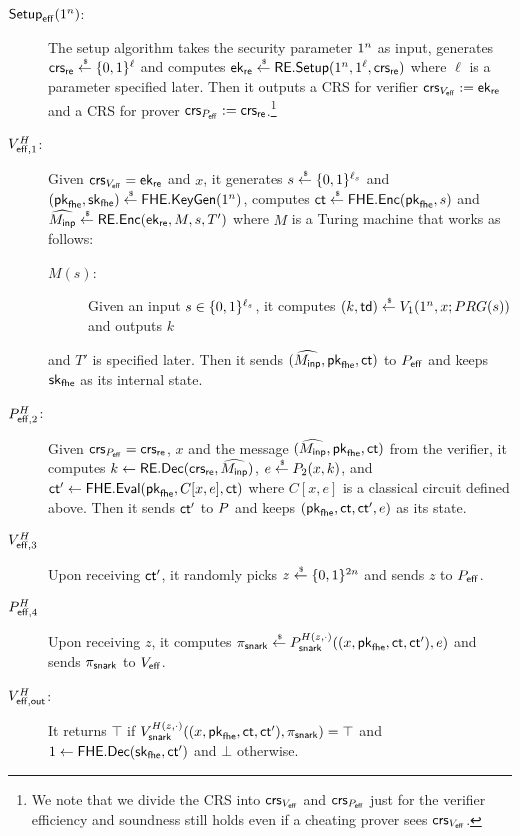 \begin{description}
\item[$\setupeff(1^\secpar)$:]
The setup algorithm takes the security parameter $1^\secpar$ as input, generates $\crs_\re \sample \bit^{\ell}$ %
and computes $\ek_\re\sample \rsetup(1^\secpar,1^\ell,\crs_\re)$ %
where $\ell$ is a parameter specified later.
Then it outputs a CRS for verifier $\crs_{\vereff}\defeq \ek_\re$ and a CRS for prover $\crs_{\proeff}\defeq \crs_\re$.\footnote{We note that we divide the CRS into $\crs_{\vereff}$ and $\crs_{\proeff}$ just for the verifier efficiency and soundness still holds even if a cheating prover sees $\crs_{\vereff}$.} 
\item[$\vereffone^{H}$:] 
Given $\crs_{\vereff}= \ek_\re$ and $x$, 
it generates $s\sample \bit^{\ell_s}$ and $(\pk_{\fhe},\sk_{\fhe})\sample \fhekeygen(1^\secpar)$,
computes $\ct\sample \fheenc(\pk_{\fhe},s)$
and  $\Menc\sample \renc(\ek_\re,M,s,T')$
where $M$ is a Turing machine that works as follows:
\begin{description}
\item[$M(s)$:] Given an input $s\in \bit^{\ell_s}$, it computes $(k,\td)\sample \ver_1(1^\secpar,x;PRG(s))$ and outputs $k$
\end{description}
and $T'$ is specified later.
Then it sends $(\Menc,\pk_{\fhe},\ct)$ to $\proeff$ and keeps $\sk_{\fhe}$ as its internal state.

\item[$\proefftwo^{H}$:] Given $\crs_{\proeff}=\crs_\re$, $x$ and the message  $(\Menc,\pk_{\fhe},\ct)$ from the verifier, it computes $k\la \rdec(\crs_{\re},\Menc)$, $e\sample \pro_2(x,k)$, and $\ct'\la \fheeval(\pk_{\fhe},C[x,e],\ct)$ where $C[x,e]$ is a classical circuit defined above.
Then it sends $\ct'$ to $\pro$ and keeps $(\pk_{\fhe},\ct,\ct',e)$ as its state.
\item[$\vereffthree^{H}$] Upon receiving $\ct'$, it randomly picks $z\sample \bit^{2\secpar}$ and sends $z$ to $\proeff$.
\item[$\proefffour^{H}$] Upon receiving $z$, 
it computes $\pi_\snark \sample \pro_{\snark}^{H(z,\cdot)}((x,\pk_{\fhe},\ct,\ct'),e)$
and sends $\pi_\snark$ to $\vereff$.

\item[$\vereffout^{H}$:] 
It returns $\top$ if $\ver_{\snark}^{H(z,\cdot)}((x,\pk_{\fhe},\ct,\ct'),\pi_{\snark})=\top$ and $1 \la \fhedec(\sk_{\fhe},\ct')$ and $\bot$ otherwise.
\end{description}

